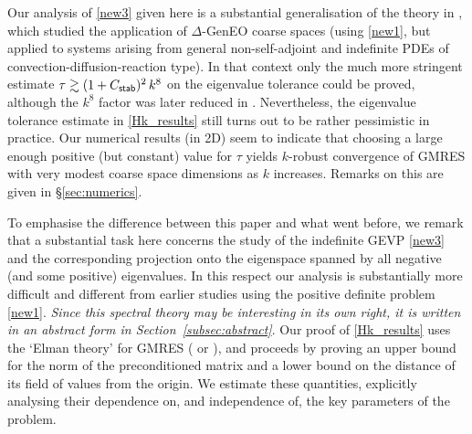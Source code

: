 \documentclass[numbers,webpdf,imaiai]{ima-authoring-template}%
\theoremstyle{thmstyletwo}%
\numberwithin{equation}{section}
\numberwithin{equation}{section}
\newcommand{\Cstab}{C_{\textup{\textsf{stab}}}}
\begin{document}
{Our analysis of \eqref{new3} given here is a substantial generalisation of the theory in \cite{Bootland:2022:OSM}, 
which studied the application of  $\Delta$-GenEO coarse spaces (using \eqref{new1}, but applied to systems arising 
from general non-self-adjoint and indefinite PDEs of convection-diffusion-reaction type). 
In that context only the much more stringent estimate $\tau \gtrsim  (1+\Cstab)^2\,k^{8}$ on the eigenvalue tolerance could be proved, 
although the $k^8$ factor was later reduced in \cite{Dolean:2024:ITE}.  
Nevertheless, the eigenvalue tolerance estimate in \eqref{Hk_results} still turns out to be rather pessimistic in practice. 
Our numerical results (in 2D)  seem to indicate that choosing a large enough positive (but constant) value for $\tau$ 
yields $k$-robust convergence of GMRES with very modest coarse space dimensions as $k$ increases. 
Remarks on this are given in \S \ref{sec:numerics}.  

To emphasise the difference between this paper and what went before, we remark that a
substantial task here concerns the study of the indefinite GEVP \eqref{new3} and the corresponding projection onto the eigenspace 
spanned by all negative (and some positive) eigenvalues.  In this respect our analysis is substantially more difficult and different 
from earlier studies using the positive definite problem \eqref{new1}. 
\textit{Since this spectral theory may be interesting in its own right, it is written in an abstract form in Section~\ref{subsec:abstract}}.  
Our proof of \eqref{Hk_results} uses the `Elman theory' for GMRES (\cite{Elman:1983:VIM} or \cite[Lemma C.11]{Toselli:2005:DDM}),
and proceeds by proving an upper bound for the norm of the preconditioned matrix and a lower bound on the 
distance of its field of values from the origin. We estimate these quantities, explicitly analysing their dependence on, 
and independence of, the key parameters of the problem.

}
\end{document}
